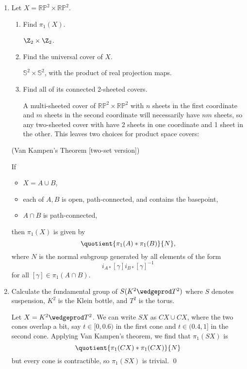 \documentclass[12pt,letterpaper]{article}
\newcommand{\RP}{\mathbb{RP}}
\renewcommand{\S}{\mathbb{S}}
\begin{document}
\begin{enumerate}
\pagebreak
\item Let $X=\RP^2\times\RP^2$.
	\begin{enumerate}[label=(\alph*)]
	\item Find $\pi_1(X)$. 
	
	\answer	$\Z_2\times\Z_2$. 
	
	\item Find the universal cover of $X$. 
	
	\answer $\S^2\times \S^2$, with the product of real projection maps. 
	
	
	\item Find all of its connected 2-sheeted covers.
	
	\answer A multi-sheeted cover of $\RP^2\times\RP^2$ with $n$ sheets in the first coordinate and $m$ sheets in the second coordinate will necessarily have $nm$ sheets, so any two-sheeted cover with have 2 sheets in one coordinate and 1 sheet in the other. This leaves two choices for product space covers: 
	\end{enumerate}

\pagebreak 

\begin{theorem*}(Van Kampen's Theorem [two-set version])

If 
	\begin{itemize}
	\item $X=A\cup B$, 
	\item each of $A,B$ is open, path-connected, and contains the basepoint, 
	\item $A\cap B$ is path-connected,
	\end{itemize}
then $\pi_1(X)$ is given by  $$\quotient{\pi_1(A)*\pi_1(B)}{N},$$
where $N$ is the normal subgroup generated by all elements of the form 
$$i_{A*}[\gamma]i_{B*}[\gamma]^{-1}$$ 
for all $[\gamma]\in\pi_1(A\cap B)$. 
\end{theorem*}

\item Calculate the fundamental group of $S(K^2\wedgeprod T^2)$  where $S$ denotes suspension, $K^2$ is the Klein bottle, and $T^2$ is the torus. 

\answer	Let $X=K^2\wedgeprod T^2$. We can write $SX$ as $CX\cup CX$, where the two cones overlap a bit, say $t\in [0,0.6)$ in the first cone and $t\in(0.4,1]$ in the second cone. Applying Van Kampen's theorem, we find that $\pi_1(SX)$ is 
$$\quotient{\pi_1(CX)*\pi_1(CX)}{N}$$
but every cone is contractible, so $\pi_1(SX)$ is trivial. \qed


\end{enumerate}
\end{document}
